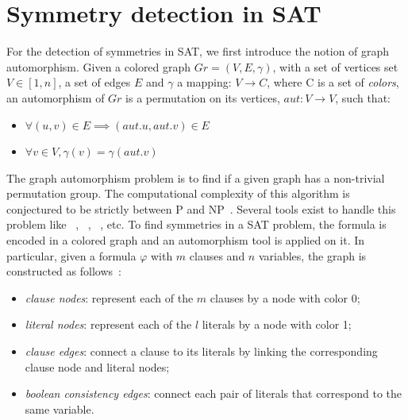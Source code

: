 \section{Symmetry detection in SAT}
For the detection of symmetries in SAT, we first introduce the notion of graph automorphism.
Given a colored graph $Gr = (V, E, \gamma)$, with a set of vertices set $V \in  [1, n] $, a set of edges $E$ and
$\gamma$ a mapping: $V \rightarrow C$, where C is a set of \emph{colors},
an automorphism of $Gr$ is a permutation on its vertices, $aut :V \rightarrow V$,
such that:
\begin{itemize}
 \item $\forall (u, v) \in E \implies (aut.u, aut.v) \in E$
 \item $\forall v \in V, \gamma(v) = \gamma(aut.v)$
\end{itemize}
The graph automorphism problem is to find if a given graph has a non-trivial permutation group. 
The computational complexity of this algorithm is conjectured to be strictly between P and NP~\cite{kobler2012graph,toran2004hardness}.
Several tools exist to handle this problem like \saucy~\cite{katebi2010symmetry},
\bliss~\cite{JunttilaKaski:ALENEX2007}, \nauty~\cite{mckay2003nauty}, etc.
%
To find symmetries in a SAT problem, the formula is encoded in a colored graph
and an automorphism tool is applied on it. In particular, given a formula $\varphi$ with
$m$ clauses and $n$ variables, the graph is constructed as follows~\cite{biere2009handbook}:
\begin{itemize}
 \item \emph{clause nodes}: represent each of the $m$ clauses by a node with color 0;
 \item \emph{literal nodes}: represent each of the $l$ literals by a node with color 1;
 \item \emph{clause edges}: connect a clause to its literals by linking the corresponding  clause node and literal nodes;
 \item \emph{boolean consistency edges}: connect each pair of literals that correspond to the same variable.
\end{itemize}
